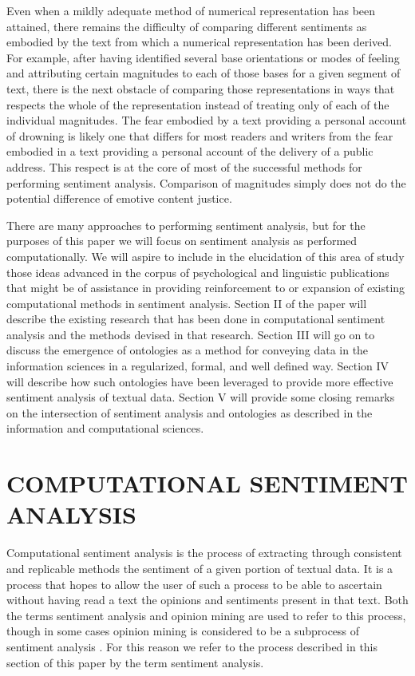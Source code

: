 \documentclass[letterpaper, 10 pt, conference]{ieeeconf}
\begin{document}
Even when a mildly adequate method of numerical representation has been attained, there remains the difficulty of comparing different sentiments as embodied by the text from which a numerical representation has been derived. For example, after having identified several base orientations or modes of feeling and attributing certain magnitudes to each of those bases for a given segment of text, there is the next obstacle of comparing those representations in ways that respects the whole of the representation instead of treating only of each of the individual magnitudes. The fear embodied by a text providing a personal account of drowning is likely one that differs for most readers and writers from the fear embodied in a text providing a personal account of the delivery of a public address. This respect is at the core of most of the successful methods for performing sentiment analysis. Comparison of magnitudes simply does not do the potential difference of emotive content justice.

There are many approaches to performing sentiment analysis, but for the purposes of this paper we will focus on sentiment analysis as performed computationally. We will aspire to include in the elucidation of this area of study those ideas advanced in the corpus of psychological and linguistic publications that might be of assistance in providing reinforcement to or expansion of existing computational methods in sentiment analysis. Section II of the paper will describe the existing research that has been done in computational sentiment analysis and the methods devised in that research. Section III will go on to discuss the emergence of ontologies as a method for conveying data in the information sciences in a regularized, formal, and well defined way. Section IV will describe how such ontologies have been leveraged to provide more effective sentiment analysis of textual data. Section V will provide some closing remarks on the intersection of sentiment analysis and ontologies as described in the information and computational sciences.

\section{COMPUTATIONAL SENTIMENT ANALYSIS}
Computational sentiment analysis is the process of extracting through consistent and replicable methods the sentiment of a given portion of textual data. It is a process that hopes to allow the user of such a process to be able to ascertain without having read a text the opinions and sentiments present in that text. Both the terms sentiment analysis and opinion mining are used to refer to this process, though in some cases opinion mining is considered to be a subprocess of sentiment analysis \textcolor{gray}{\cite{PangLee,RaviRavi}}. For this reason we refer to the process described in this section of this paper by the term sentiment analysis.
\end{document}

